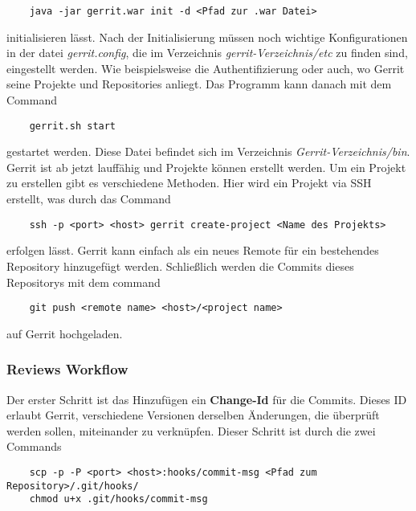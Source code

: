 {\color{blue}
\begin{verbatim}
	java -jar gerrit.war init -d <Pfad zur .war Datei> 
\end{verbatim}}

initialisieren lässt. Nach der Initialisierung müssen noch wichtige Konfigurationen in der datei \textit{gerrit.config}, die im Verzeichnis \textit{gerrit-Verzeichnis/etc} zu finden sind, eingestellt werden. Wie beispielsweise die Authentifizierung oder auch, wo Gerrit seine Projekte und Repositories anliegt. Das Programm kann danach mit dem Command

{\color{blue} 
\begin{verbatim}
	gerrit.sh start
\end{verbatim}}

gestartet werden. Diese Datei befindet sich im Verzeichnis \textit{Gerrit-Verzeichnis/bin}. Gerrit ist ab jetzt lauffähig und Projekte können erstellt werden. Um ein Projekt zu erstellen  gibt es verschiedene Methoden. Hier wird  ein Projekt via SSH erstellt, was durch das Command

{\color{blue}
\begin{verbatim}
	ssh -p <port> <host> gerrit create-project <Name des Projekts>
\end{verbatim}}

erfolgen lässt. Gerrit kann einfach als ein neues Remote für ein bestehendes Repository hinzugefügt werden. Schließlich werden die Commits dieses Repositorys mit dem command

{\color{blue}
\begin{verbatim}
	git push <remote name> <host>/<project name>
\end{verbatim}}

auf Gerrit hochgeladen.

\subsubsection{Reviews Workflow}
\label{subsubsec:Reviews Workflow bei Gerrit}

Der erster Schritt ist das Hinzufügen ein \textbf{Change-Id} für die Commits. Dieses ID erlaubt Gerrit, verschiedene Versionen derselben Änderungen, die überprüft werden sollen, miteinander zu verknüpfen. Dieser Schritt ist durch die zwei Commands

{\color{blue}
\begin{verbatim}
	scp -p -P <port> <host>:hooks/commit-msg <Pfad zum Repository>/.git/hooks/
	chmod u+x .git/hooks/commit-msg
\end{verbatim}}

